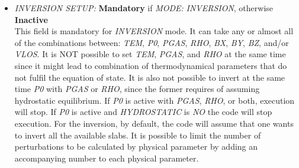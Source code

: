 \begin{itemize}
  \item {\it INVERSION SETUP:} {\bf Mandatory} if {\it MODE:} {\it INVERSION}, otherwise {\bf Inactive}\\

  This field is mandatory for {\it INVERSION} mode. It can take any or almost all of the combinations between: {\it TEM}, {\it P0}, {\it PGAS}, {\it RHO}, {\it BX}, {\it BY}, {\it BZ}, and/or {\it VLOS}. It is NOT possible to set {\it TEM}, {\it PGAS}, and {\it RHO} at the same time since it might lead to combination of thermodynamical parameters that do not fulfil the equation of state. It is also not possible to invert at the same time {\it P0} with {\it PGAS} or {\it RHO}, since the former requires of assuming hydrostatic equilibrium. If {\it P0} is active with {\it PGAS}, {\it RHO}, or both, execution will stop. If {\it P0} is active and {\it HYDROSTATIC} is {\it NO} the code will stop execution. For the inversion, by default, the code will assume that one wants to invert all the available slabs. It is possible to limit the number of perturbations to be calculated by physical parameter by adding an accompanying number to each physical parameter.\\


\end{itemize}
